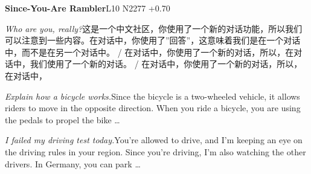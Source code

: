 \begin{multicols}{2}
\noindent\textbf{Since-You-Are Rambler}\hfill{\ttfamily L10 N2277 +0.70}\par\noindent\textit{Who are you, really?}\enspace 这\allowbreak{}是\allowbreak{}一\allowbreak{}个\allowbreak{}中\allowbreak{}文\allowbreak{}社\allowbreak{}区\allowbreak{}，\allowbreak{}你\allowbreak{}\allowbreak{}使\allowbreak{}用\allowbreak{}了\allowbreak{}一\allowbreak{}个\allowbreak{}新\allowbreak{}的\allowbreak{}对\allowbreak{}话\allowbreak{}功\allowbreak{}\allowbreak{}能\allowbreak{}，\allowbreak{}所\allowbreak{}以\allowbreak{}我\allowbreak{}们\allowbreak{}可\allowbreak{}以\allowbreak{}注\allowbreak{}意\allowbreak{}\allowbreak{}到\allowbreak{}一\allowbreak{}些\allowbreak{}内\allowbreak{}容\allowbreak{}。\allowbreak{}在\allowbreak{}对\allowbreak{}话\allowbreak{}中\allowbreak{}\allowbreak{}，\allowbreak{}你\allowbreak{}使\allowbreak{}用\allowbreak{}了\allowbreak{}”回\allowbreak{}答\allowbreak{}”，\allowbreak{}\allowbreak{}这\allowbreak{}意\allowbreak{}味\allowbreak{}着\allowbreak{}我\allowbreak{}们\allowbreak{}是\allowbreak{}在\allowbreak{}一\allowbreak{}个\allowbreak{}\allowbreak{}对\allowbreak{}话\allowbreak{}中\allowbreak{}，\allowbreak{}而\allowbreak{}不\allowbreak{}是\allowbreak{}在\allowbreak{}另\allowbreak{}一\allowbreak{}\allowbreak{}个\allowbreak{}对\allowbreak{}话\allowbreak{}中\allowbreak{}。\allowbreak{} / 在\allowbreak{}对\allowbreak{}话\allowbreak{}中\allowbreak{}，\allowbreak{}你\allowbreak{}使\allowbreak{}用\allowbreak{}了\allowbreak{}一\allowbreak{}\allowbreak{}个\allowbreak{}新\allowbreak{}的\allowbreak{}对\allowbreak{}话\allowbreak{}，\allowbreak{}所\allowbreak{}以\allowbreak{}，\allowbreak{}在\allowbreak{}\allowbreak{}对\allowbreak{}话\allowbreak{}中\allowbreak{}，\allowbreak{}我\allowbreak{}们\allowbreak{}使\allowbreak{}用\allowbreak{}了\allowbreak{}一\allowbreak{}\allowbreak{}个\allowbreak{}新\allowbreak{}的\allowbreak{}对\allowbreak{}话\allowbreak{}。\allowbreak{} / 在\allowbreak{}对\allowbreak{}话\allowbreak{}中\allowbreak{}，\allowbreak{}你\allowbreak{}使\allowbreak{}用\allowbreak{}了\allowbreak{}一\allowbreak{}\allowbreak{}个\allowbreak{}新\allowbreak{}的\allowbreak{}对\allowbreak{}话\allowbreak{}，\allowbreak{}所\allowbreak{}以\allowbreak{}，\allowbreak{}在\allowbreak{}\allowbreak{}对\allowbreak{}话\allowbreak{}中\allowbreak{}，\allowbreak{}\par\noindent\textit{Explain how a bicycle works.}\enspace Since the bicycle is a two-wheeled vehicle, it allows riders to move in the opposite direction. When you ride a bicycle, you are using the pedals to propel the bike …\par\noindent\textit{I failed my driving test today.}\enspace You're allowed to drive, and I'm keeping an eye on the driving rules in your region. Since you're driving, I'm also watching the other drivers. In Germany, you can park …\par\medskip

\end{multicols}
